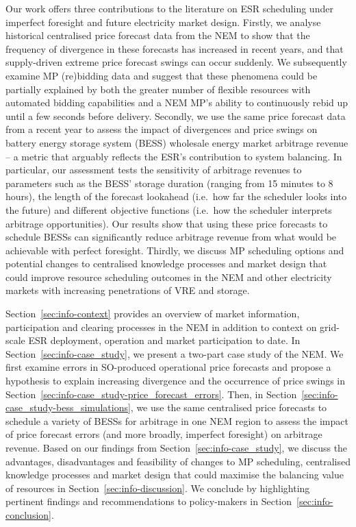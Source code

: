 \documentclass[12pt,a4paper,]{report}
\begin{document}
Our work offers three contributions to the literature on ESR scheduling
under imperfect foresight and future electricity market design. Firstly,
we analyse historical centralised price forecast data from the NEM to
show that the frequency of divergence in these forecasts has increased
in recent years, and that supply-driven extreme price forecast swings
can occur suddenly. We subsequently examine MP (re)bidding data and
suggest that these phenomena could be partially explained by both the
greater number of flexible resources with automated bidding capabilities
and a NEM MP's ability to continuously rebid up until a few seconds
before delivery. Secondly, we use the same price forecast data from a
recent year to assess the impact of divergences and price swings on
battery energy storage system (BESS) wholesale energy market arbitrage
revenue -- a metric that arguably reflects the ESR's contribution to
system balancing. In particular, our assessment tests the sensitivity of
arbitrage revenues to parameters such as the BESS' storage duration
(ranging from 15 minutes to 8 hours), the length of the forecast
lookahead (i.e.~how far the scheduler looks into the future) and
different objective functions (i.e.~how the scheduler interprets
arbitrage opportunities). Our results show that using these price
forecasts to schedule BESSs can significantly reduce arbitrage revenue
from what would be achievable with perfect foresight. Thirdly, we
discuss MP scheduling options and potential changes to centralised
knowledge processes and market design that could improve resource
scheduling outcomes in the NEM and other electricity markets with
increasing penetrations of VRE and storage.

Section~\ref{sec:info-context} provides an overview of market
information, participation and clearing processes in the NEM in addition
to context on grid-scale ESR deployment, operation and market
participation to date. In Section~\ref{sec:info-case_study}, we present
a two-part case study of the NEM. We first examine errors in SO-produced
operational price forecasts and propose a hypothesis to explain
increasing divergence and the occurrence of price swings in
Section~\ref{sec:info-case_study-price_forecast_errors}. Then, in
Section~\ref{sec:info-case_study-bess_simulations}, we use the same
centralised price forecasts to schedule a variety of BESSs for arbitrage
in one NEM region to assess the impact of price forecast errors (and
more broadly, imperfect foresight) on arbitrage revenue. Based on our
findings from Section~\ref{sec:info-case_study}, we discuss the
advantages, disadvantages and feasibility of changes to MP scheduling,
centralised knowledge processes and market design that could maximise
the balancing value of resources in Section~\ref{sec:info-discussion}.
We conclude by highlighting pertinent findings and recommendations to
policy-makers in Section~\ref{sec:info-conclusion}.
\end{document}
